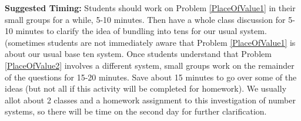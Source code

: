 \documentclass{ximera}
\begin{document}
\begin{instructorNotes}
{\bf Suggested Timing:} Students should work on Problem \ref{PlaceOfValue1} in their small groups for a while, 5-10 minutes.  Then have a whole class discussion for 5-10 minutes to clarify the idea of bundling into tens for our usual system. (sometimes students are not immediately aware that Problem \ref{PlaceOfValue1} is about our usual base ten system. Once students understand that Problem \ref{PlaceOfValue2} involves a different system, small groups work on the remainder of the questions for 15-20 minutes.  Save about 15 minutes to go over some of the ideas (but not all if this activity will be completed for homework).  We usually allot about 2 classes and a homework assignment to this investigation of number systems, so there will be time on the second day for further clarification.

\end{instructorNotes}
\end{document}
